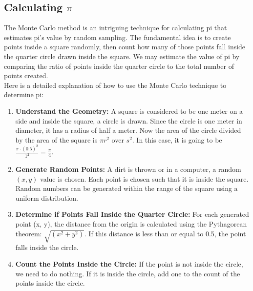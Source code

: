 \documentclass[12pt]{article}
\begin{document}
    \subsection{Calculating $\pi$}
    The Monte Carlo method is an intriguing technique for calculating pi that estimates pi's value by random sampling. The fundamental idea is to create points inside a square randomly, then count how many of those points fall inside the quarter circle drawn inside the square. We may estimate the value of pi by comparing the ratio of points inside the quarter circle to the total number of points created.\\
    Here is a detailed explanation of how to use the Monte Carlo technique to determine pi:
    \begin{enumerate}
    \item \textbf{Understand the Geometry:} A square is considered to be one meter on a side and inside the square, a circle is drawn. Since the circle is one meter in diameter, it has a radius of half a meter. Now the area of the circle divided by the area of the square is $\pi r^2$ over $s^2$. In this case, it is going to be $\frac{\pi\cdot (0.5)^2}{1^2}= \frac{\pi}{4}$.
    \item \textbf{Generate Random Points:} A dirt is thrown or in a computer, a random $(x,y)$ value is chosen. Each point is chosen such that it is inside the square. Random numbers can be generated within the range of the square using a uniform distribution.
    \item \textbf{Determine if Points Fall Inside the Quarter Circle:}  For each generated point (x, y), the distance from the origin is calculated using the Pythagorean theorem: $\sqrt{(x^2 + y^2)}$. If this distance is less than or equal to 0.5, the point falls inside the circle.
    \item \textbf{Count the Points Inside the Circle:} If the point is not inside the circle, we need to do nothing. If it is inside the circle, add one to the count of the points inside the circle.
        \begin{center}
\end{center}
\end{enumerate}
\end{document}
